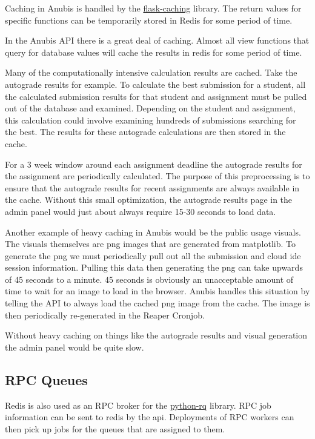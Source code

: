 Caching in Anubis is handled by the
\href{https://flask-caching.readthedocs.io/en/latest/index.html}{flask-caching} library.
The return values for specific functions can be temporarily stored in Redis for some
period of time.

In the Anubis API there is a great deal of caching.
Almost all view functions that query for database values will cache the results in redis
for some period of time.

Many of the computationally intensive calculation results are cached.
Take the autograde results for example.
To calculate the best submission for a student, all the
calculated submission results for that student and assignment must be pulled
out of the database and examined.
Depending on the student and assignment, this calculation could involve
examining hundreds of submissions searching for the best.
The results for these autograde calculations are then stored in the cache.

For a 3 week window around each assignment deadline the autograde results
for the assignment are periodically calculated.
The purpose of this preprocessing is to ensure that the autograde results
for recent assignments are always available in the cache.
Without this small optimization, the autograde results page in the admin
panel would just about always require 15-30 seconds to load data.

Another example of heavy caching in Anubis would be the public usage visuals.
The visuals themselves are png images that are generated from matplotlib.
To generate the png we must periodically pull out all the submission
and cloud ide session information.
Pulling this data then generating the png can take upwards of 45 seconds to a minute.
45 seconds is obviously an unacceptable amount of time to wait for an image to load
in the browser.
Anubis handles this situation by telling the API to always load the cached png image
from the cache.
The image is then periodically re-generated in the Reaper Cronjob.

Without heavy caching on things like the autograde results and visual generation
the admin panel would be quite slow.

\subsection{RPC Queues}\label{subsec:rpc-queues}

Redis is also used as an RPC broker for the \href{https://python-rq.org}{python-rq}
library.
RPC job information can be sent to redis by the api.
Deployments of RPC workers can then pick up jobs for the queues that are assigned to them.

